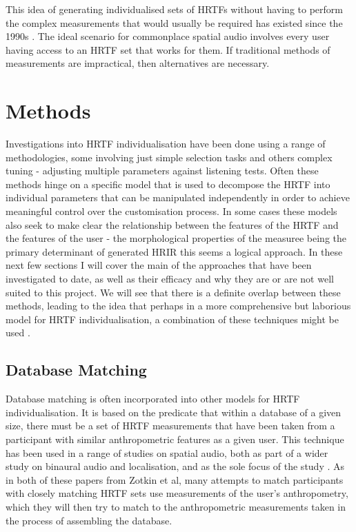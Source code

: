 
This idea of generating individualised sets of HRTFs without having to perform the complex measurements that would usually be required has existed since the 1990s \citep{Kulkarni1995}. The ideal scenario for commonplace spatial audio involves every user having access to an HRTF set that works for them. If traditional methods of measurements are impractical, then alternatives are necessary.

\section{Methods}
Investigations into HRTF individualisation have been done using a range of methodologies, some involving just simple selection tasks \citep{Zotkin2002} and others complex tuning \citep{Tan1998} - adjusting multiple parameters against listening tests. Often these methods hinge on a specific model that is used to decompose the HRTF into individual parameters that can be manipulated independently in order to achieve meaningful control over the customisation process. In some cases these models also seek to make clear the relationship between the features of the HRTF and the features of the user - the morphological properties of the measuree being the primary determinant of generated HRIR this seems a logical approach. In these next few sections I will cover the main of the approaches that have been investigated to date, as well as their efficacy and why they are or are not well suited to this project. We will see that there is a definite overlap between these methods, leading to the idea that perhaps in a more comprehensive but laborious model for HRTF individualisation, a combination of these techniques might be used \citep{Hoene2017}.

\subsection{Database Matching}
Database matching is often incorporated into other models for HRTF individualisation. It is based on the predicate that within a database of a given size, there must be a set of HRTF measurements that have been taken from a participant with similar anthropometric features as a given user. This technique has been used in a range of studies on spatial audio, both as part of a wider study on binaural audio and localisation, \citep{Zotkin2002} and as the sole focus of the study \citep{Zotkin}. As in both of these papers from Zotkin et al, many attempts to match participants with closely matching HRTF sets use measurements of the user's anthropometry, which they will then try to match to the anthropometric measurements taken in the process of assembling the database. 

